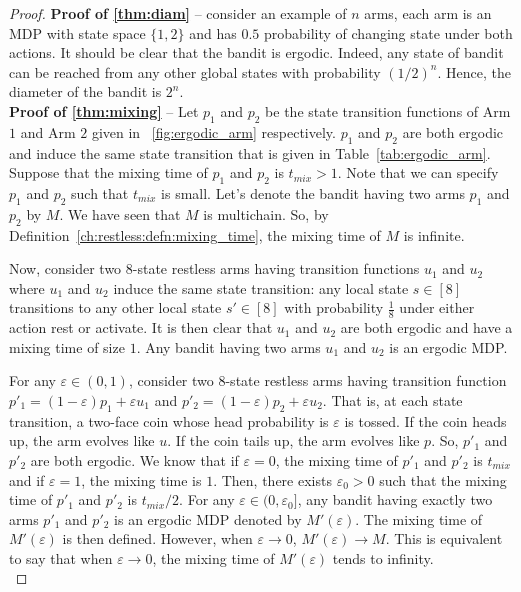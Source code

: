 \begin{proof}
    \textbf{Proof of \ref{thm:diam}} -- consider an example of $n$ arms, each arm is an MDP with state space $\{1,2\}$ and has $0.5$ probability of changing state under both actions.
    It should be clear that the bandit is ergodic.
    Indeed, any state of bandit can be reached from any other global states with probability $(1/2)^n$.
    Hence, the diameter of the bandit is $2^n$.
    \medskip \\

    \textbf{Proof of \ref{thm:mixing}} -- Let $p_1$ and $p_2$ be the state transition functions of Arm $1$ and Arm $2$ given in \figurename~\ref{fig:ergodic_arm} respectively.
    $p_1$ and $p_2$ are both ergodic and induce the same state transition that is given in Table~\ref{tab:ergodic_arm}.
    Suppose that the mixing time of $p_1$ and $p_2$ is $t_{mix}>1$.
    Note that we can specify $p_1$ and $p_2$ such that $t_{mix}$ is small.
    Let's denote the bandit having two arms $p_1$ and $p_2$ by $M$.
    We have seen that $M$ is multichain.
    So, by Definition~\ref{ch:restless:defn:mixing_time}, the mixing time of $M$ is infinite.

    Now, consider two 8-state restless arms having transition functions $u_1$ and $u_2$ where $u_1$ and $u_2$ induce the same state transition: any local state $s\in[8]$ transitions to any other local state $s'\in[8]$ with probability $\frac18$ under either action rest or activate.
    It is then clear that $u_1$ and $u_2$ are both ergodic and have a mixing time of size $1$.
    Any bandit having two arms $u_1$ and $u_2$ is an ergodic MDP.

    For any $\varepsilon\in(0,1)$, consider two 8-state restless arms having transition function $p'_1=(1-\varepsilon)p_1+\varepsilon u_1$ and $p'_2=(1-\varepsilon)p_2+\varepsilon u_2$.
    That is, at each state transition, a two-face coin whose head probability is $\varepsilon$ is tossed.
    If the coin heads up, the arm evolves like $u$.
    If the coin tails up, the arm evolves like $p$.
    So, $p'_1$ and $p'_2$ are both ergodic.
    We know that if $\varepsilon=0$, the mixing time of $p'_1$ and $p'_2$ is $t_{mix}$ and if $\varepsilon=1$, the mixing time is $1$.
    Then, there exists $\varepsilon_0>0$ such that the mixing time of $p'_1$ and $p'_2$ is $t_{mix}/2$.
    For any $\varepsilon\in(0,\varepsilon_0]$, any bandit having exactly two arms $p'_1$ and $p'_2$ is an ergodic MDP denoted by $M'(\varepsilon)$.
    The mixing time of $M'(\varepsilon)$ is then defined.
    However, when $\varepsilon\to0$, $M'(\varepsilon)\to M$.
    This is equivalent to say that when $\varepsilon\to0$, the mixing time of $M'(\varepsilon)$ tends to infinity.
    \medskip \\


\end{proof}

